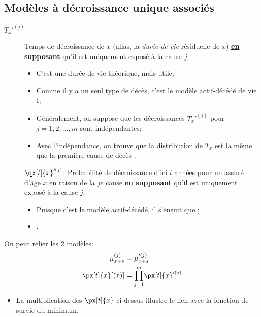 \documentclass[10pt, french]{article}
\begin{document}
\begin{multicols*}{2}
\subsection{Modèles à décroissance unique associés}
\begin{description}
	\item[$T_{x}'^{(j)}$]	Temps de décroissance de $x$ (alias, la \textit{durée de vie} résiduelle de $x$) \underline{\textbf{en supposant}} qu'il est uniquement exposé à la cause $j$;
		\begin{itemize}[leftmargin = *]
		\item	C'est une durée de vie théorique, mais utile;
		\item	Comme il y a un seul type de décès, c'est le modèle actif-décédé de vie I;
		\item	Généralement, on suppose que les décroissances $T_{x}'^{(j)}$ pour $j = 1, 2, \dots, m$ sont indépendantes;
		\item	Avec l'indépendance, on trouve que la distribution de $T_{x}$ est la même que la première cause de décès .
		\end{itemize}
	\item[]	$\qx[t]{x}'^{(j)}$:	Probabilité de décroissance d'ici $t$ années pour un assuré d'âge $x$ en raison de la $j$e cause \underline{\textbf{en supposant}} qu'il est uniquement exposé à la cause $j$;
		\begin{itemize}[leftmargin = *]
		\item	Puisque c'est le modèle actif-décédé, il s'ensuit que ;
		\item	{}.
		\end{itemize}
\end{description}

On peut relier les 2 modèles:
\begin{align*}
	\mu_{x + s}^{(j)}
	&=	\mu_{x + s}'^{(j)}	\\
	\px[t]{x}[(\tau)]
	&=	\underset{j = 1}{\overset{m}{\prod}} \px[t]{x}'^{(j)}
\end{align*}
\begin{itemize}[leftmargin = *]
	\item	 La multiplication des $\px[t]{x}$ ci-dessus illustre le lien avec la fonction de survie du minimum.
\end{itemize}


\end{multicols*}
\end{document}
